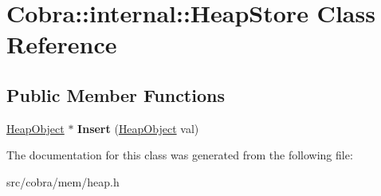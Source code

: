 \hypertarget{class_cobra_1_1internal_1_1_heap_store}{\section{Cobra\+:\+:internal\+:\+:Heap\+Store Class Reference}
\label{class_cobra_1_1internal_1_1_heap_store}
}
\subsection*{Public Member Functions}
\begin{DoxyCompactItemize}
\item 
\hypertarget{class_cobra_1_1internal_1_1_heap_store_adcf5e620d5f98a2162a70075f60190dc}{\hyperlink{struct_cobra_1_1internal_1_1_heap_object}{Heap\+Object} $\ast$ {\bfseries Insert} (\hyperlink{struct_cobra_1_1internal_1_1_heap_object}{Heap\+Object} val)}\label{class_cobra_1_1internal_1_1_heap_store_adcf5e620d5f98a2162a70075f60190dc}

\end{DoxyCompactItemize}


The documentation for this class was generated from the following file\+:\begin{DoxyCompactItemize}
\item 
src/cobra/mem/heap.\+h\end{DoxyCompactItemize}
